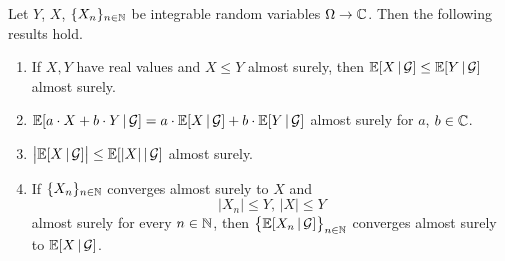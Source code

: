 \begin{theorem}\label{theorem:mainpropertiesofconditionalexpectation}
Let $Y$, $X$, $\{X_n\}_{n\in {\mathbb N}}$ be integrable random variables $\Omega \rightarrow {\mathbb C}$. Then the following results hold.
\begin{enumerate}[label=\emph{\textbf{(\arabic*)}}, leftmargin=*]
\item If $X,Y$ have real values and $X \leq Y$ almost surely, then ${\mathbb E}[X\,|\,{\mathcal G}] \leq {\mathbb E}[Y\,|\,{\mathcal G}]$ almost surely.
\item ${\mathbb E}[a\cdot X+b\cdot Y\,|\,{\mathcal G}] = a\cdot {\mathbb E}[X\,|\,{\mathcal G}]+b\cdot {\mathbb E}[Y\,|\,{\mathcal G}]$ almost surely for $a$, $b\in {\mathbb C}$.
\item $\big|{\mathbb E}[X\,|\,{\mathcal G}]\big|\leq {\mathbb E}[|X|\,|\,{\mathcal G}]$ almost surely.
\item If $\{X_n\}_{n\in {\mathbb N}}$ converges almost surely to $X$ and 
$$|X_n|\leq Y,\,|X|\leq Y$$
almost surely for every $n\in {\mathbb N}$, then $\big\{{\mathbb E}[X_n\,|\,{\mathcal G}]\big\}_{n\in {\mathbb N}}$ converges almost surely to ${\mathbb E}[X\,|\,{\mathcal G}]$.
\end{enumerate}
\end{theorem}
